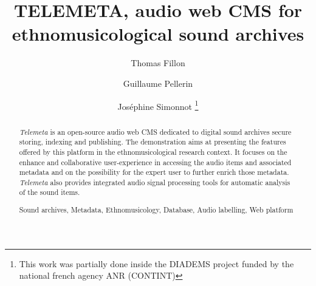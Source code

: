 \documentclass[runningheads,a4paper]{llncs}
\newcommand{\keywords}[1]{\par\addvspace\baselineskip
\noindent\keywordname\enspace\ignorespaces#1}
\begin{document}
\mainmatter  %

\title{TELEMETA, audio web CMS for ethnomusicological sound archives}


%
%
\author{Thomas Fillon \and Guillaume Pellerin
 \and Jos{\'e}phine Simonnot 
\thanks{This work was partially done inside the DIADEMS project funded by the national french agency ANR (CONTINT)}
}
%


\maketitle

\setcounter{footnote}{0}


\begin{abstract}
\emph{Telemeta} is an open-source audio web CMS dedicated to digital sound archives secure storing, indexing and publishing. The demonstration aims at presenting the features offered by this platform in the ethnomusicological research context. It focuses on the enhance and collaborative user-experience in accessing the audio items and associated metadata and on the possibility for the expert user to further enrich those metadata. \emph{Telemeta} also provides integrated audio signal processing tools for automatic analysis of the sound items.
\keywords{Sound archives, Metadata, Ethnomusicology, Database, Audio labelling, Web platform}
\end{abstract}
\end{document}
